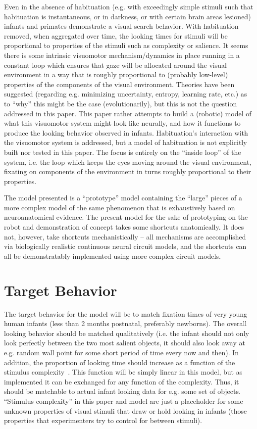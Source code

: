 \documentclass[conference]{IEEEtran}
\begin{document}
Even in the absence of habituation (e.g. with exceedingly simple
stimuli such that habituation is instantaneous, or in darkness, or
with certain brain areas lesioned) infants and primates demonstrate a
visual search behavior. With habituation removed, when aggregated over
time, the looking times for stimuli will be proportional to properties
of the stimuli such as complexity or salience. It seems there is some
intrinsic visuomotor mechanism/dynamics in place running in a constant
loop which ensures that gaze will be allocated around the visual
environment in a way that is roughly proportional to (probably
low-level) properties of the components of the visual
environment. Theories have been suggested (regarding e.g. minimizing
uncertainty, entropy, learning rate, etc.) as to ``why'' this might be
the case (evolutionarily), but this is not the question addressed in
this paper. This paper rather attempts to build a (robotic) model of
what this visuomotor system might look like neurally, and how it
functions to produce the looking behavior observed in
infants. Habituation's interaction with the visuomotor system is
addressed, but a model of habituation is not explicitly built nor
tested in this paper. The focus is entirely on the ``inside loop'' of
the system, i.e. the loop which keeps the eyes moving around the
visual environment, fixating on components of the environment in turns
roughly proportional to their properties.

The model presented is a ``prototype'' model containing the ``large''
pieces of a more complex model of the same phenomenon that is
exhaustively based on neuroanatomical evidence. The present model for
the sake of prototyping on the robot and demonstration of concept
takes some shortcuts anatomically. It does not, however, take
shortcuts mechanistically -- all mechanisms are accomplished via
biologically realistic continuous neural circuit models, and the
shortcuts can all be demonstratably implemented using more complex
circuit models.
\section{Target Behavior}
The target behavior for the model will be to match fixation times of
very young human infants (less than 2 months postnatal, preferably
newborns). The overall looking behavior should be matched
qualitatively (i.e.  the infant should not only look perfectly between
the two most salient objects, it should also look away at e.g. random
wall point for some short period of time every now and then). In
addition, the proportion of looking time should increase as a function
of the stimulus complexity~\cite{lewis_kagan_kalafat_1966}. This
function will be simply linear in this model, but as implemented it
can be exchanged for any function of the complexity. Thus, it should
be matchable to actual infant looking data for e.g. some set of
objects. ``Stimulus complexity'' in this paper and model are just a
placeholder for some unknown properties of visual stimuli that draw or
hold looking in infants (those properties that experimenters try to
control for between stimuli).
\end{document}
